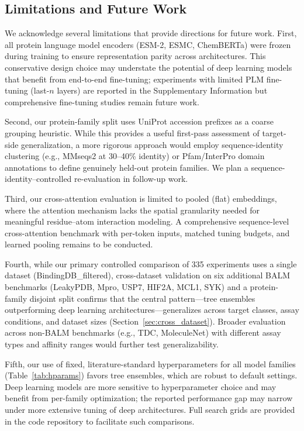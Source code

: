 \documentclass[11pt,twocolumn,a4paper]{article}
\begin{document}
\subsection{Limitations and Future Work}

We acknowledge several limitations that provide directions for future work. First, all protein language model encoders (ESM-2, ESMC, ChemBERTa) were frozen during training to ensure representation parity across architectures. This conservative design choice may understate the potential of deep learning models that benefit from end-to-end fine-tuning; experiments with limited PLM fine-tuning (last-$n$ layers) are reported in the Supplementary Information but comprehensive fine-tuning studies remain future work.

Second, our protein-family split uses UniProt accession prefixes as a coarse grouping heuristic. While this provides a useful first-pass assessment of target-side generalization, a more rigorous approach would employ sequence-identity clustering (e.g., MMseqs2 at 30--40\% identity) or Pfam/InterPro domain annotations to define genuinely held-out protein families. We plan a sequence-identity--controlled re-evaluation in follow-up work.

Third, our cross-attention evaluation is limited to pooled (flat) embeddings, where the attention mechanism lacks the spatial granularity needed for meaningful residue--atom interaction modeling. A comprehensive sequence-level cross-attention benchmark with per-token inputs, matched tuning budgets, and learned pooling remains to be conducted.

Fourth, while our primary controlled comparison of 335 experiments uses a single dataset (BindingDB\_filtered), cross-dataset validation on six additional BALM benchmarks (LeakyPDB, Mpro, USP7, HIF2A, MCL1, SYK) and a protein-family disjoint split confirms that the central pattern---tree ensembles outperforming deep learning architectures---generalizes across target classes, assay conditions, and dataset sizes (Section~\ref{sec:cross_dataset}). Broader evaluation across non-BALM benchmarks (e.g., TDC, MoleculeNet) with different assay types and affinity ranges would further test generalizability.

Fifth, our use of fixed, literature-standard hyperparameters for all model families (Table~\ref{tab:hparams}) favors tree ensembles, which are robust to default settings. Deep learning models are more sensitive to hyperparameter choice and may benefit from per-family optimization; the reported performance gap may narrow under more extensive tuning of deep architectures. Full search grids are provided in the code repository to facilitate such comparisons.
\end{document}
